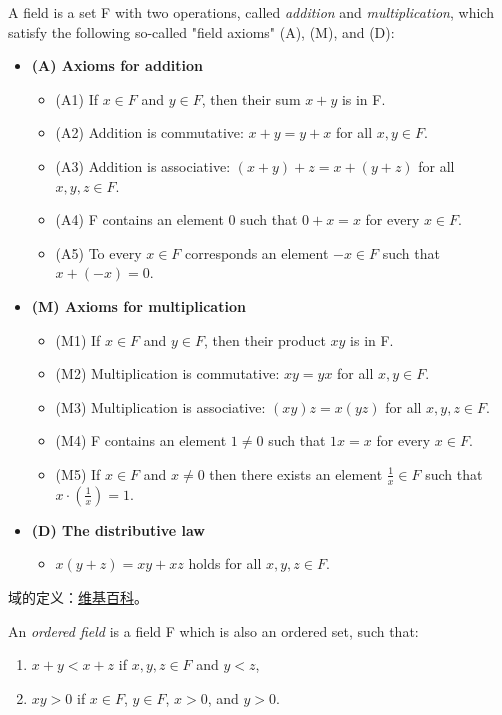 \documentclass[../poma-notes.tex]{subfiles}
\begin{document}
\begin{definition}
	A field is a set F with two operations, called \textit{addition} and \textit{multiplication},
	which satisfy the following so-called "field axioms" (A), (M), and (D):

	\begin{itemize}
		\item[] \textbf{(A) Axioms for addition}
			\begin{itemize}
				\item[] (A1) If $x \in F$ and $y \in F$, then their sum $x + y$ is in F.
				\item[] (A2) Addition is commutative: $x + y = y + x$ for all $x,y \in F$.
				\item[] (A3) Addition is associative: $(x+y)+z=x+(y+z)$ for all $x,y,z \in F$.
				\item[] (A4) F contains an element 0 such that $0+x=x$ for every $x \in F$.
				\item[] (A5) To every $x \in F$ corresponds an element $-x \in F$ such that $x+(-x)=0$.
			\end{itemize}
		\item[] \textbf{(M) Axioms for multiplication}
			\begin{itemize}
				\item[] (M1) If $x \in F$ and $y \in F$, then their product $xy$ is in F.
				\item[] (M2) Multiplication is commutative: $xy = yx$ for all $x,y \in F$.
				\item[] (M3) Multiplication is associative: $(xy)z = x(yz)$ for all $x,y,z \in F$.
				\item[] (M4) F contains an element $1 \ne 0$ such that $1x = x$ for every $x \in F$.
				\item[] (M5) If $x \in F$ and $x \ne 0$ then there exists an element $\frac{1}{x} \in F$
					such that $x \cdot (\frac{1}{x}) = 1$.
			\end{itemize}
		\item[] \textbf{(D) The distributive law}
			\begin{itemize}
				\item[] $x(y+z) = xy+xz$ holds for all $x,y,z \in F$.
			\end{itemize}
	\end{itemize}
\end{definition}

\anote
域的定义：\href{https://en.wikipedia.org/wiki/Field_(mathematics)}{维基百科}。

\setcounter{poma}{16}
\begin{definition}
	An \textit{ordered field} is a field F which is also an ordered set, such that:

	\begin{enumerate}
		\item $x+y<x+z$ if $x,y,z \in F$ and $y<z$,
		\item $xy>0$ if $x \in F$, $y \in F$, $x>0$, and $y>0$.
	\end{enumerate}
\end{definition}
\end{document}
